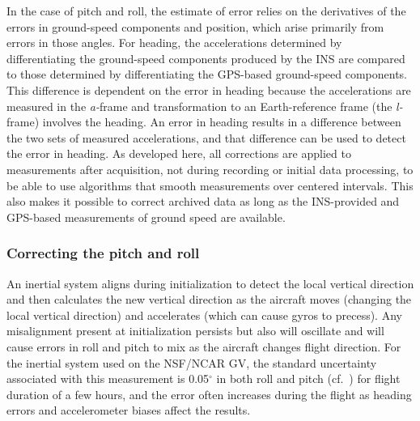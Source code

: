 \documentclass[12pt,twoside,english,12pt,twoside,english]{article}\usepackage[]{graphicx}\usepackage[]{color}
\let\OrgIndex\index
\renewcommand*{\index}[1]{\OrgIndex{#1}}
\begin{document}
In the case of pitch and roll, the estimate of error relies on the
derivatives of the errors in ground-speed
components and position, which arise primarily
from errors in those angles. For heading,
the accelerations  determined by
differentiating the ground-speed components produced by the INS
are compared to those determined by differentiating the GPS-based
ground-speed components.
This difference is dependent on the error in
heading because the accelerations are measured
in the \emph{a-}frame
and transformation to an Earth-reference
frame (the \emph{l-}frame) involves the heading. An error in heading
results in a difference between the two sets of measured accelerations,
and that difference can be used to detect the error in heading. As
developed here, all corrections are applied to measurements after
acquisition, not during recording or initial data processing, to be
able to use algorithms that smooth measurements
over centered intervals. This also makes it possible to correct archived
data as long as the INS-provided and GPS-based measurements of ground
speed are available.

\subsubsection{Correcting the pitch and roll\label{sec:Correcting-the-pitch}}

An inertial system aligns during
initialization to detect
the local vertical direction and
then calculates the new vertical direction as the aircraft moves (changing
the local vertical direction) and accelerates (which can cause gyros
to precess). Any misalignment present at initialization persists but
also will oscillate and will cause errors in roll
and pitch to mix as the aircraft changes flight direction. For the
inertial system used on the NSF/NCAR
GV, the standard uncertainty associated with this measurement
is 0.05$^{\circ}$ in both roll and pitch (cf.~\citet{Cooper2016ncartn})
for flight duration of a few hours, and the error often increases
during the flight as heading errors and accelerometer
biases affect
the results. 
\end{document}
